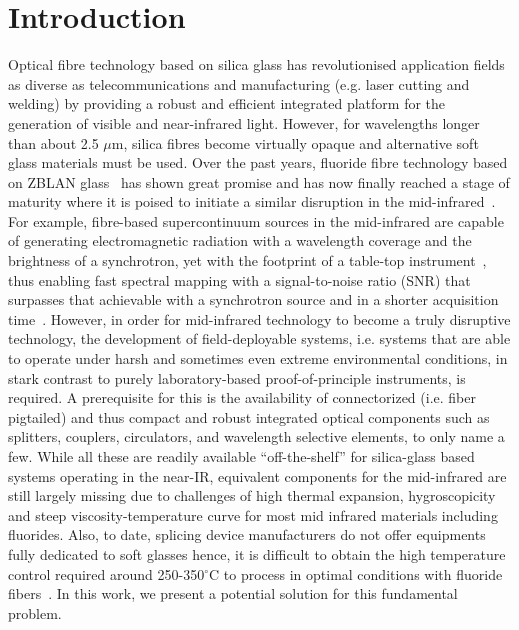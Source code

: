 \documentclass[11pt]{article}
\begin{document}
\label{--------------------------------------------sec: intro---------------------------------------------------}
\section{Introduction}\label{sec: intro}

Optical fibre technology based on silica glass has revolutionised application fields as diverse as telecommunications and manufacturing (e.g. laser cutting and welding) by providing a robust and efficient integrated platform for the generation of visible and near-infrared light. However, for wavelengths longer than about 2.5 $\mu$m, silica fibres become virtually opaque and alternative soft glass materials must be used. Over the past years, fluoride fibre technology based on ZBLAN glass~\cite{POULAIN1973} has shown great promise and has now finally reached a stage of maturity where it is poised to initiate a similar disruption in the mid-infrared~\cite{Jackson2012}. For example, fibre-based supercontinuum sources in the mid-infrared are capable of generating electromagnetic radiation with a wavelength coverage and the brightness of a synchrotron, yet with the footprint of a table-top instrument~\cite{Hudson17}, thus enabling fast spectral mapping with a signal-to-noise ratio (SNR) that surpasses that achievable with a synchrotron source and in a shorter acquisition time~\cite{Borondics18}. However, in order for mid-infrared technology to become a truly disruptive technology, the development of field-deployable systems, i.e. systems that are able to operate under harsh and sometimes even extreme environmental conditions, in stark contrast to purely laboratory-based proof-of-principle instruments, is required. A prerequisite for this is the availability of connectorized (i.e. fiber pigtailed) and thus compact and robust integrated optical components such as splitters, couplers, circulators, and wavelength selective elements, to only name a few. While all these are readily available “off-the-shelf” for silica-glass based systems operating in the near-IR, equivalent components for the mid-infrared are still largely missing due to challenges of high thermal expansion, hygroscopicity and steep viscosity-temperature curve for most mid infrared materials including fluorides. Also, to date, splicing device manufacturers do not offer equipments fully dedicated to soft glasses hence, it is difficult to obtain the high temperature control required around 250-350$^{\circ}$C to process in optimal conditions with fluoride fibers~\cite{Rowe, Schafer18}. In this work, we present a potential solution for this fundamental problem. 
\end{document}
